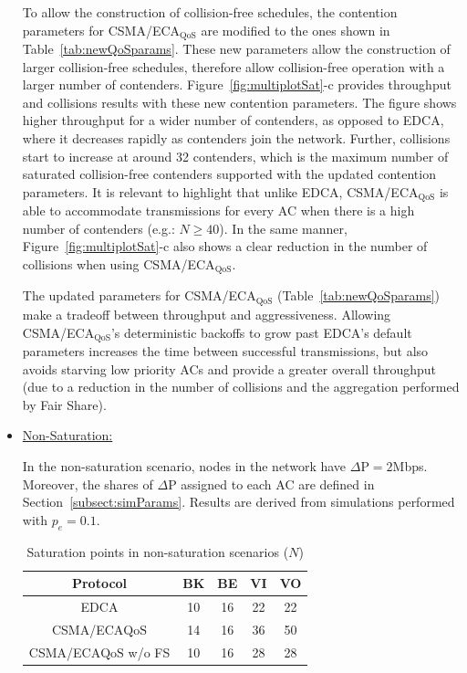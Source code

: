 \begin{itemize}
To allow the construction of collision-free schedules, the contention parameters for CSMA/ECA$_{\text{QoS}}$ are modified to the ones shown in Table~\ref{tab:newQoSparams}. These new parameters allow the construction of larger collision-free schedules, therefore allow collision-free operation with a larger number of contenders. Figure~\ref{fig:multiplotSat}-c provides throughput and collisions results with these new contention parameters. The figure shows higher throughput for a wider number of contenders, as opposed to EDCA, where it decreases rapidly as contenders join the network. Further, collisions start to increase at around 32 contenders, which is the maximum number of saturated collision-free contenders supported with the updated contention parameters. It is relevant to highlight that unlike EDCA, CSMA/ECA$_{\text{QoS}}$ is able to accommodate transmissions for every AC when there is a high number of contenders (e.g.: $N\geq 40$). In the same manner, Figure~\ref{fig:multiplotSat}-c also shows a clear reduction in the number of collisions when using CSMA/ECA$_{\text{QoS}}$.

The updated parameters for CSMA/ECA$_{\text{QoS}}$ (Table~\ref{tab:newQoSparams}) make a tradeoff between throughput and aggressiveness. Allowing CSMA/ECA$_{\text{QoS}}$'s deterministic backoffs to grow past EDCA's default parameters increases the time between successful transmissions, but also avoids starving low priority ACs and provide a greater overall throughput (due to a reduction in the number of collisions and the aggregation performed by Fair Share).

\item\underline{Non-Saturation:}

In the non-saturation scenario, nodes in the network have $\Delta\text{P}=2$Mbps. Moreover, the shares of $\Delta\text{P}$ assigned to each AC are defined in Section~\ref{subsect:simParams}. Results are derived from simulations performed with $p_e=0.1$.

	\begin{table}[t]
		\centering
		\caption{Saturation points in non-saturation scenarios ($N$)}
		\label{tab:satPoints}
		\begin{tabular}{|c|c|c|c|c|}
			\hline
			{\bfseries Protocol} 				& {\bfseries BK} & {\bfseries BE} & {\bfseries VI} & {\bfseries VO}\\
			\hline
			EDCA						&	10		&	16		&		22	&	22\\	
			\hline
			CSMA/ECA${\text{QoS}}$		&	14		&	16		&		36	&	50\\
			\hline
			CSMA/ECA${\text{QoS}}$ w/o FS	&	10		&	16		&		28	&	28\\
			\hline
		\end{tabular}
	\end{table}


\end{itemize}
